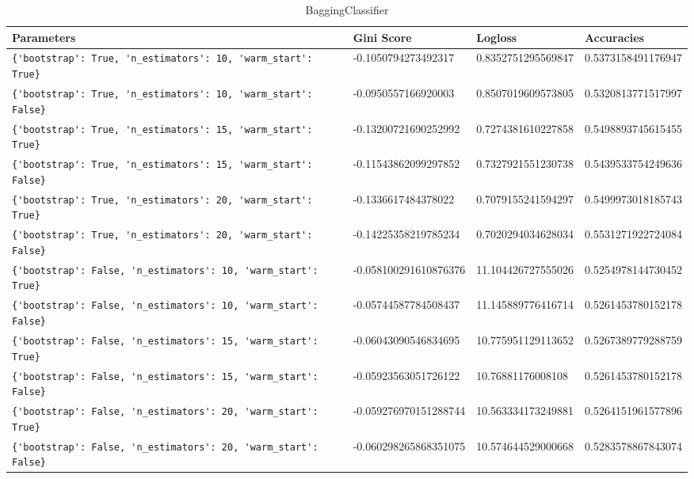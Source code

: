 \begin{table} \centering
\caption{BaggingClassifier} 
\label{pt:BaggingClassifier} 
\begin{tabular}{llll}\toprule\bfseries Parameters & \bfseries Gini Score & \bfseries Logloss &\bfseries Accuracies \\\midrule 
\verb|{'bootstrap': True, 'n_estimators': 10, 'warm_start': True}| & -0.1050794273492317 & 0.8352751295569847 & 0.5373158491176947 \\ 
\verb|{'bootstrap': True, 'n_estimators': 10, 'warm_start': False}| & -0.0950557166920003 & 0.8507019609573805 & 0.5320813771517997 \\ 
\verb|{'bootstrap': True, 'n_estimators': 15, 'warm_start': True}| & -0.13200721690252992 & 0.7274381610227858 & 0.5498893745615455 \\ 
\verb|{'bootstrap': True, 'n_estimators': 15, 'warm_start': False}| & -0.11543862099297852 & 0.7327921551230738 & 0.5439533754249636 \\ 
\verb|{'bootstrap': True, 'n_estimators': 20, 'warm_start': True}| & -0.1336617484378022 & 0.7079155241594297 & 0.5499973018185743 \\ 
\verb|{'bootstrap': True, 'n_estimators': 20, 'warm_start': False}| & -0.14225358219785234 & 0.7020294034628034 & 0.5531271922724084 \\ 
\verb|{'bootstrap': False, 'n_estimators': 10, 'warm_start': True}| & -0.058100291610876376 & 11.104426727555026 & 0.5254978144730452 \\ 
\verb|{'bootstrap': False, 'n_estimators': 10, 'warm_start': False}| & -0.05744587784508437 & 11.145889776416714 & 0.5261453780152178 \\ 
\verb|{'bootstrap': False, 'n_estimators': 15, 'warm_start': True}| & -0.06043090546834695 & 10.775951129113652 & 0.5267389779288759 \\ 
\verb|{'bootstrap': False, 'n_estimators': 15, 'warm_start': False}| & -0.05923563051726122 & 10.76881176008108 & 0.5261453780152178 \\ 
\verb|{'bootstrap': False, 'n_estimators': 20, 'warm_start': True}| & -0.059276970151288744 & 10.563334173249881 & 0.5264151961577896 \\ 
\verb|{'bootstrap': False, 'n_estimators': 20, 'warm_start': False}| & -0.060298265868351075 & 10.574644529000668 & 0.5283578867843074 \\ 
\bottomrule
\end{tabular}
\end{table} 

